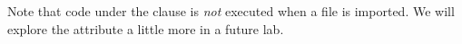 Note that code under the  clause is \emph{not} executed when a file is imported.
We will explore the  attribute a little more in a future lab.

\begin{comment}
\subsection*{Reloading and Testing}

In IPython, importing provides a quick way to test code.
However, if a module has been imported and the source code then changes (you test your code, discover and error, then fix it), the \li{reload()} function must be used to access the changes.
Using the \li{import} command again will \textbf{not} change the module.

Consider this example where we test a file containing a single function.
\begin{lstlisting}
# example2.py
def sum_of_squares(x):
    """Return the sum of the squares of all integers less than or equal to x."""
    return sum([i**2 for i in range(x)])
\end{lstlisting}

In IPython, import the file and test the \li{sum_of_squares} function.
\begin{lstlisting}
In [1]: import example2 as test

In [2]: test.sum_of_squares(3)
Out[2]: 5
\end{lstlisting}

Since $1^2 + 2^2 + 3^2 = 14$, not $5$, something has gone wrong.
We modify the file to correct the mistake:

\begin{lstlisting}
# example2.py
def sum_of_squares(x):
    """Return the sum of the squares of all integers less than or equal to x."""
    return sum([i**2 for i in range(1,x+1)])    # Be sure to include x.
\end{lstlisting}

\begin{lstlisting}
# Using import again doesn't change the loaded module, even though
# the source file was modified.
In [3]: import test

In [4]: test.sum_of_squares(3)
Out[4]: 5

# Using reload, however, updates the loaded module with the changes.
In [5]: reload(test)
Out[5]: <<<module 'example2' from 'example2.py'>>>

In [6]: test.sum_of_squares(3)
Out[6]: 14
\end{lstlisting}
\end{comment}

